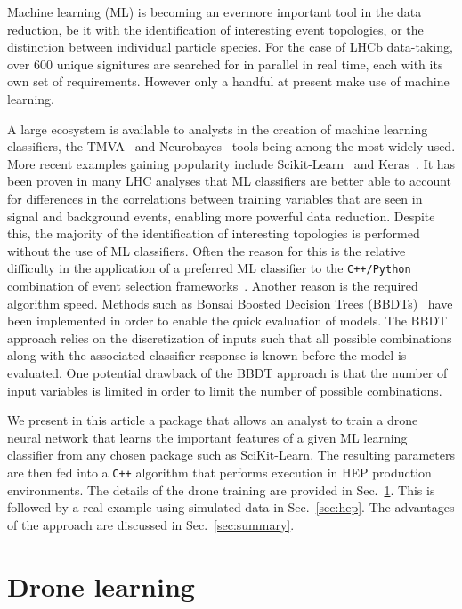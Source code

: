 \documentclass[final,5p,times,twocolumn]{elsarticle}
\def\lhcb {\mbox{LHCb}\xspace}
\begin{document}
Machine learning (ML) is becoming an evermore important tool in the data reduction,
be it with the identification of interesting event topologies, or the distinction
between individual particle species. For the case of \lhcb data-taking, over 600
unique signitures are searched for in parallel in real time, each with its own set of requirements.
However only a handful at present make use of machine learning.

A large ecosystem is available to analysts in the creation of machine learning classifiers,
the TMVA~\cite{Hocker:2007ht} and Neurobayes~\cite{Feindt:2006pm} tools being among the most widely used.
More recent examples gaining popularity include Scikit-Learn~\cite{Pedregosa:2012toh}
and Keras~\cite{keras}. It has been proven in many LHC analyses that
ML classifiers are better able to account for differences in the correlations between
training variables that are seen in signal and background events, enabling more
powerful data reduction.
Despite this, the majority of the identification of interesting topologies is performed
without the use of ML classifiers. Often the reason for this is the relative difficulty in
the application of a preferred ML classifier to the {\tt C++/Python} combination
of event selection frameworks~\cite{Barrand:2001ny}. Another 
reason is the required algorithm speed. Methods such as Bonsai
Boosted Decision Trees (BBDTs)~\cite{Gligorov:2012qt} have been implemented in order
to enable the quick evaluation of models. The BBDT approach relies on the 
discretization of inputs such that all possible combinations along with
the associated classifier response is known before the model is evaluated.
One potential drawback of the BBDT approach is that the number of input variables is limited
in order to limit the number of possible combinations. 

We present in this article a package that allows an analyst to 
train a drone neural network that learns the important features of a 
given ML learning classifier from any chosen package such as SciKit-Learn.
The resulting parameters are then fed into a {\tt C++} algorithm that
performs execution in HEP production environments. The details of the
drone training are provided in Sec.~\ref{sec:dlearn}. This is followed
by a real example using simulated data in Sec.~\ref{sec:hep}. The advantages
of the approach are discussed in Sec.~\ref{sec:summary}.


\section{Drone learning}
\label{sec:dlearn}
\end{document}
